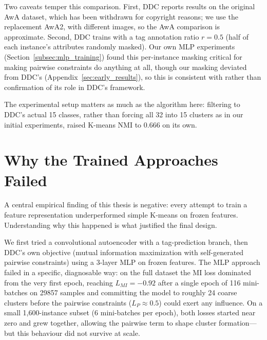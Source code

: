 Two caveats temper this comparison. First, DDC reports results on the original AwA dataset, which has been withdrawn for copyright reasons; we use the replacement AwA2, with different images, so the AwA comparison is approximate. Second, DDC trains with a tag annotation ratio $r = 0.5$ (half of each instance's attributes randomly masked). Our own MLP experiments (Section~\ref{subsec:mlp_training}) found this per-instance masking critical for making pairwise constraints do anything at all, though our masking deviated from DDC's (Appendix~\ref{sec:early_results}), so this is consistent with rather than confirmation of its role in DDC's framework.

The experimental setup matters as much as the algorithm here: filtering to DDC's actual 15 classes, rather than forcing all 32 into 15 clusters as in our initial experiments, raised K-means NMI to 0.666 on its own.

\section{Why the Trained Approaches Failed}
\label{sec:why_failed}

A central empirical finding of this thesis is negative: every attempt to train a feature representation underperformed simple K-means on frozen features. Understanding why this happened is what justified the final design.

We first tried a convolutional autoencoder with a tag-prediction branch, then DDC's own objective (mutual information maximization with self-generated pairwise constraints) using a 3-layer MLP on frozen features. The MLP approach failed in a specific, diagnosable way: on the full dataset the MI loss dominated from the very first epoch, reaching $L_{MI} = -0.92$ after a single epoch of 116 mini-batches on 29857 samples and committing the model to roughly 24 coarse clusters before the pairwise constraints ($L_P \approx 0.5$) could exert any influence. On a small 1,600-instance subset (6 mini-batches per epoch), both losses started near zero and grew together, allowing the pairwise term to shape cluster formation---but this behaviour did not survive at scale.

